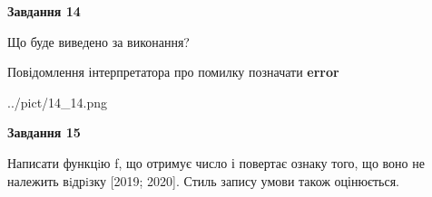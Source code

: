 \documentclass[11pt, ukrainian]{article}
\begin{document}
{\begin {large}
{\begin {center}\textbf{Завдання 14}\end {center}}\par
Що буде виведено за виконання? \par
Повідомлення інтерпретатора про помилку позначати \textbf{error}

\begin{center}
	{../pict/14_14.png}
\end{center}
\newpage

{\begin {center}\textbf{Завдання 15}\end {center}}\par

Написати функцiю f, що отримує число і повертає ознаку того, що воно не належить вiдрiзку [2019; 2020]. Стиль запису умови також оцінюється.\par
\newpage

\end {large}}
\end{document}

